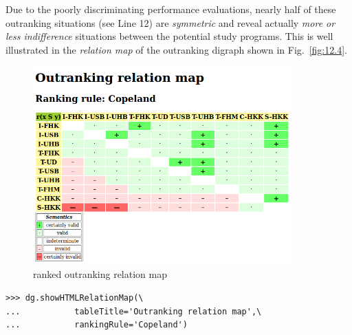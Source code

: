 Due to the poorly discriminating performance evaluations, nearly half of these outranking situations (see Line 12) are \emph{symmetric} and reveal actually \emph{more or less indifference} situations between the potential study programs. This is well illustrated in the \emph{relation map} of the outranking digraph shown in Fig.~\vref{fig:12.4}.
\begin{figure}[ht]
\includegraphics[width=10cm]{Figures/12-4-aliceRelationmap.png}
\caption{\Copeland ranked outranking relation map}
\label{fig:12.4}       %
\end{figure}
\begin{lstlisting}
>>> dg.showHTMLRelationMap(\
...           tableTitle='Outranking relation map',\
...           rankingRule='Copeland')
\end{lstlisting}

